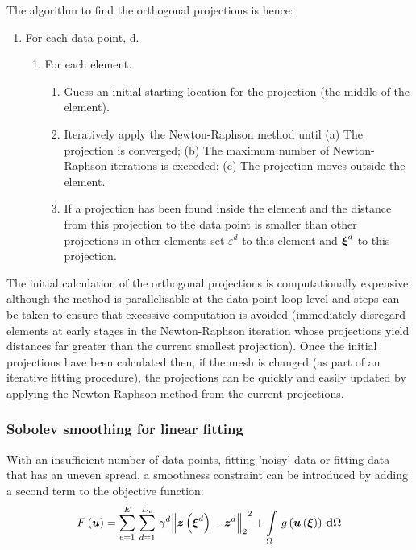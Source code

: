 The algorithm to find the orthogonal projections is hence:
\begin{enumerate}
\item For each data point, d.
  \begin{enumerate}
  \item For each element.
    \begin{enumerate}
    \item Guess an initial starting location for the projection (\eg the
      middle of the element).
    \item Iteratively apply the Newton-Raphson method until (a) The projection
      is converged; (b) The maximum number of Newton-Raphson iterations is
      exceeded; (c) The projection moves outside the element.
    \item If a projection has been found inside the element and the distance
      from this projection to the data point is smaller than other projections
      in other elements set $\varepsilon^{d}$ to this element and
      $\vect{\xi}^{d}$ to this projection.
    \end{enumerate}
  \end{enumerate}
\end{enumerate}

The initial calculation of the orthogonal projections is computationally
expensive although the method is parallelisable at the data point loop level
and steps can be taken to ensure that excessive
computation is avoided (\eg immediately disregard elements at early stages in
the Newton-Raphson iteration whose projections yield distances far greater
than the current smallest projection). Once the initial projections have been
calculated then, if the mesh is changed (as part of an iterative fitting
procedure), the projections can be quickly and easily updated by applying the
Newton-Raphson method from the current projections.

\subsubsection{Sobolev smoothing for linear fitting}
\label{sec:sobolevlinearfitting}

With an insufficient number of data points, fitting 'noisy' data or fitting
data that has an uneven spread, a smoothness constraint \cite{young:1989}
can be introduced by adding a second term to the objective function:
\begin{equation}
  \fnof{F}{\vectr{u}}=\gsum{e=1}{E}{\gsum{d=1}{D_{e}}{\gamma^{d}
    \norm{\fnof{\vectr{z}}{\vectr{\xi}^{d}}-\vectr{z}^{d}}^{2}}}+
  \gint{\Omega}{}{\fnof{g}{\fnof{\vectr{u}}{\vectr{\xi}}}}{\Omega}
  \label{eqn:soboleverrorfn}
\end{equation}

